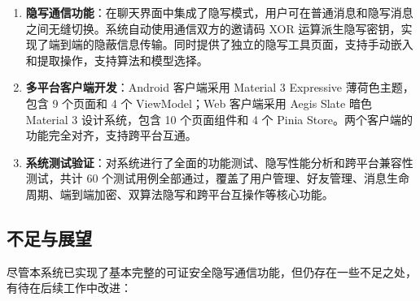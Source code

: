 \begin{enumerate}
    \item \textbf{隐写通信功能}：在聊天界面中集成了隐写模式，用户可在普通消息和隐写消息之间无缝切换。系统自动使用通信双方的邀请码 XOR 运算派生隐写密钥，实现了端到端的隐蔽信息传输。同时提供了独立的隐写工具页面，支持手动嵌入和提取操作，支持算法和模型选择。

    \item \textbf{多平台客户端开发}：Android 客户端采用 Material 3 Expressive 薄荷色主题，包含 9 个页面和 4 个 ViewModel；Web 客户端采用 Aegis Slate 暗色 Material 3 设计系统，包含 10 个页面组件和 4 个 Pinia Store。两个客户端的功能完全对齐，支持跨平台互通。

    \item \textbf{系统测试验证}：对系统进行了全面的功能测试、隐写性能分析和跨平台兼容性测试，共计 60 个测试用例全部通过，覆盖了用户管理、好友管理、消息生命周期、端到端加密、双算法隐写和跨平台互操作等核心功能。
\end{enumerate}

\subsection{不足与展望}\label{sec:future_work}

尽管本系统已实现了基本完整的可证安全隐写通信功能，但仍存在一些不足之处，有待在后续工作中改进：

